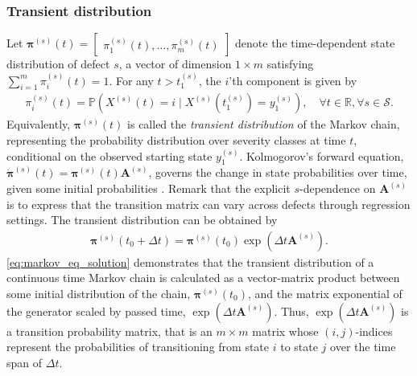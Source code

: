 \subsubsection{Transient distribution} \label{sec:transient_dist}
Let $\bm{\pi}^{(s)}(t) = \begin{bmatrix} \pi^{(s)}_1(t), \dots, \pi^{(s)}_m(t) \end{bmatrix}$ denote the time-dependent state distribution of defect $s$, a vector of dimension $1 \times m$ satisfying $\sum_{i = 1}^m \pi^{(s)}_i(t) = 1$. For any $t>t_1^{(s)}$, the $i$'th component is given by
\begin{align}
\pi_i^{(s)}(t) = \mathds{P} \left( X^{(s)}(t) = i \mid X^{(s)}(t_1^{(s)}) = y_1^{(s)}  \right), \quad \forall t\in \mathbb{R}, \forall s \in \mathcal{S}. \label{eq:transient_dist} 
\end{align}
Equivalently, $\bm{\pi}^{(s)}(t)$ is called the \textit{transient distribution} of the Markov chain, representing the probability distribution over severity classes at time $t$, conditional on the observed starting state $y_1^{(s)}$.
Kolmogorov's forward equation, $\Dot{\bm{\pi}}^{(s)}(t) = \bm{\pi}^{(s)}(t) \bm{A}^{(s)}$, governs the change in state probabilities over time, given some initial probabilities \citep[Section 1.3]{bladt_nielsen}. Remark that the explicit $s$-dependence on $\bm{A}^{(s)}$ is to express that the transition matrix can vary across defects through regression settings.
The transient distribution can be obtained by
\begin{equation}
\begin{aligned}
                  \bm{\pi}^{(s)}(t_0 + \Delta t) = 
                  \bm{\pi}^{(s)}(t_0) \exp{ ( \Delta t \bm{A}^{(s)} ) }. \label{eq:markov_eq_solution} %
\end{aligned}     
\end{equation}
\cref{eq:markov_eq_solution} demonstrates that the transient distribution of a continuous time Markov chain is calculated as a vector-matrix product between some initial distribution of the chain, $\bm{\pi}^{(s)}(t_0)$, and the matrix exponential of the generator scaled by passed time, $\exp{ ( \Delta t \bm{A}^{(s)} ) }$. Thus, $\exp{ ( \Delta t \bm{A}^{(s)} ) }$ is a transition probability matrix, that is an $m \times m$ matrix whose $(i,j)$-indices represent the probabilities of transitioning from state $i$ to state $j$ over the time span of $\Delta t$.

